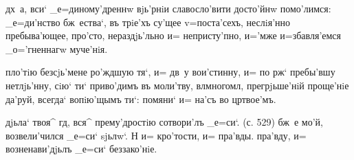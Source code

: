 дх~а, вси` _е=диному'дреннw вjь'рнiи славосло'вити 
досто'йнw помо'лимся: _е=ди'нство бж~ества`, въ трiе'хъ 
су'щее v=поста'сехъ, неслiя'нно пребыва'ющее, про'сто, 
нераздjь'льно и= непристу'пно, и='мже и=збавля'емся 
_о='гненнагw муче'нiя.

пло'тiю без\ъ сjь'мене ро'ждшую тя`, и= дв~у вои'стинну, 
и= по рж` пребы'вшу нетлjь'нну, сiю` ти` приво'димъ 
въ моли'тву, вл многомл, прегрjьше'нiй 
проще'нiе да'руй, всегда` вопiю'щымъ ти`: помяни` и= 
на'съ во цр твое'мъ.

дjьла` твоя^ гд, вся^ прему'дростiю сотвори'лъ _е=си`. 
(с. 529) %
бж~е мо'й, возвели'чился _е=си` sjьлw`. %
Н%
и= кро'тости, и= пра'вды. %
пра'вду, и= возненави'дjьлъ _е=си` беззако'нiе.

